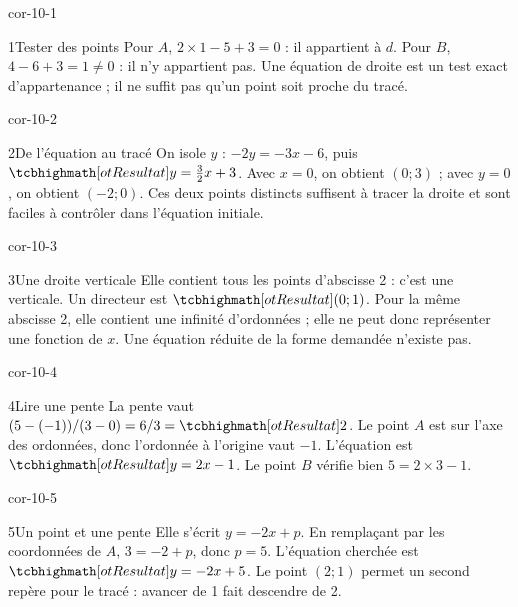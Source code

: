 \clearpage\pagestyle{otMain}\fontsize{11}{15}\selectfont
{}
\begin{blocLivre}{cor-10-1}
\begin{corrige}{1}{Tester des points}
Pour $A$, $2\times1-5+3=0$ : il appartient à $d$. Pour $B$, $4-6+3=1\ne0$ : il n’y appartient pas. Une équation de droite est un test exact d’appartenance ; il ne suffit pas qu’un point soit proche du tracé.
\label{fig-cor-10-1}
\end{corrige}
\end{blocLivre}
\begin{blocLivre}{cor-10-2}
\begin{corrige}{2}{De l’équation au tracé}
On isole $y$ : $-2y=-3x-6$, puis $\res{y=\tfrac32x+3}$. Avec $x=0$, on obtient $(0;3)$ ; avec $y=0$, on obtient $(-2;0)$. Ces deux points distincts suffisent à tracer la droite et sont faciles à contrôler dans l’équation initiale.
\label{fig-cor-10-2}
\end{corrige}
\end{blocLivre}
\begin{blocLivre}{cor-10-3}
\begin{corrige}{3}{Une droite verticale}
Elle contient tous les points d’abscisse 2 : c’est une verticale. Un directeur est $\res{(0;1)}$. Pour la même abscisse 2, elle contient une infinité d’ordonnées ; elle ne peut donc représenter une fonction de $x$. Une équation réduite de la forme demandée n’existe pas.
\label{fig-cor-10-3}
\end{corrige}
\end{blocLivre}
\begin{blocLivre}{cor-10-4}
\begin{corrige}{4}{Lire une pente}
La pente vaut $(5-(-1))/(3-0)=6/3=\res2$. Le point $A$ est sur l’axe des ordonnées, donc l’ordonnée à l’origine vaut $-1$. L’équation est $\res{y=2x-1}$. Le point $B$ vérifie bien $5=2\times3-1$.
\label{fig-cor-10-4}
\end{corrige}
\end{blocLivre}
\begin{blocLivre}{cor-10-5}
\begin{corrige}{5}{Un point et une pente}
Elle s’écrit $y=-2x+p$. En remplaçant par les coordonnées de $A$, $3=-2+p$, donc $p=5$. L’équation cherchée est $\res{y=-2x+5}$. Le point $(2;1)$ permet un second repère pour le tracé : avancer de 1 fait descendre de 2.
\label{fig-cor-10-5}
\end{corrige}
\end{blocLivre}
